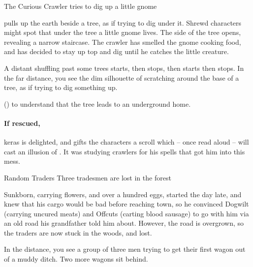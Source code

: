 \label{interruptions}

{The Curious Crawler}%
{ tries to dig up a little gnome}%

 pulls up the earth beside a tree, as if trying to dig under it.
Shrewd characters might spot that under the tree a little gnome lives.
The side of the tree opens, revealing a narrow staircase.
The \gls{crawler} has smelled the gnome cooking food, and has decided to stay up top and dig until he catches the little creature.

\begin{boxtext}
  A distant shuffling past some trees starts, then stops, then starts then stops.
  In the far distance, you see the dim silhouette of  scratching around the base of a tree, as if trying to dig something up.
\end{boxtext}

 (\tn[9]) to understand that the tree leads to an underground home.

\chitincrawler

\keras

\paragraph{If rescued,}
\gls{keras} is delighted, and gifts the characters a scroll which -- once read aloud -- will cast an illusion of .
It was studying \glspl{crawler} for his spells that got him into this mess.

{Random Traders}%
{Three tradesmen are lost in the forest}%

Sunkborn, carrying flowers, and over a hundred eggs, started the day late, and knew that his cargo would be bad before reaching \gls{town}, so he convinced Dogwilt (carrying uncured meats) and Offcuts (carting blood sausage) to go with him via an old road his grandfather told him about.
However, the road is overgrown, so the traders are now stuck in the woods, and lost.

\begin{boxtext}
  In the distance, you see a group of three men trying to get their first wagon out of a muddy ditch.
  Two more wagons sit behind.
\end{boxtext}


